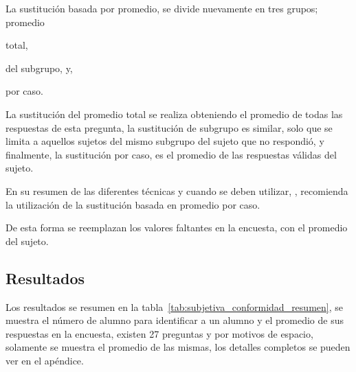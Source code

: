 La sustitución basada por promedio, se divide nuevamente en tres grupos;
promedio
\begin{enumerate*}[label=\itshape\alph*\upshape.]
\item total,
\item del subgrupo, y,
\item por caso.
\end{enumerate*}
La sustitución del promedio total se realiza obteniendo el promedio de todas las
respuestas de esta pregunta, la sustitución de subgrupo es similar, solo que se
limita a aquellos sujetos del mismo subgrupo del sujeto que no respondió, y
finalmente, la sustitución por caso, es el promedio de las respuestas válidas
del sujeto.

En su resumen de las diferentes técnicas y cuando se deben utilizar,
\cite{tsikriktsis2005review}, recomienda la utilización de la sustitución basada
en promedio por caso. 

De esta forma se reemplazan los valores faltantes en la encuesta, con el
promedio del sujeto.

\subsection{Resultados}

Los resultados se resumen en la tabla~\ref{tab:subjetiva_conformidad_resumen},
se muestra el número de alumno para identificar a un alumno y el promedio de sus
respuestas en la encuesta, existen 27 preguntas y por motivos de espacio,
solamente se muestra el promedio de las mismas, los detalles completos se pueden
ver en el apéndice.

